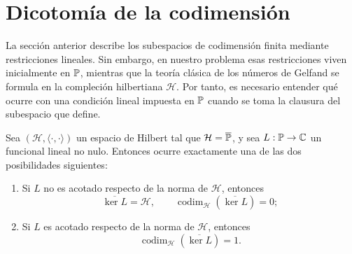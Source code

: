 \section{Dicotomía de la codimensión}

La sección anterior describe los subespacios de codimensión finita mediante restricciones lineales. Sin embargo, en nuestro problema esas restricciones viven inicialmente en \(\mathbb{P}\), mientras que la teoría clásica de los números de Gelfand se formula en la compleción hilbertiana \(\mathcal H\). Por tanto, es necesario entender qué ocurre con una condición lineal impuesta en \(\mathbb{P}\) cuando se toma la clausura del subespacio que define.

\begin{prop}\label{thm:dicotomia_1}
	Sea $(\mathcal H,\langle\cdot,\cdot\rangle)$ un espacio de Hilbert tal que $\mathcal H=\overline{\mathbb{P}}$, y sea $L:\mathbb{P}\to\mathbb C$ un funcional lineal no nulo. Entonces ocurre exactamente una de las dos posibilidades siguientes:
	\begin{enumerate}
		\item Si $L$ no es acotado respecto de la norma de $\mathcal H$, entonces
		      \[
			      \overline{\ker L}=\mathcal H,
			      \qquad
			      \operatorname{codim}_{\mathcal H}(\overline{\ker L})=0;
		      \]
		\item Si $L$ es acotado respecto de la norma de $\mathcal H$, entonces
		      \[
			      \operatorname{codim}_{\mathcal H}(\overline{\ker L})=1.
		      \]
	\end{enumerate}
\end{prop}

